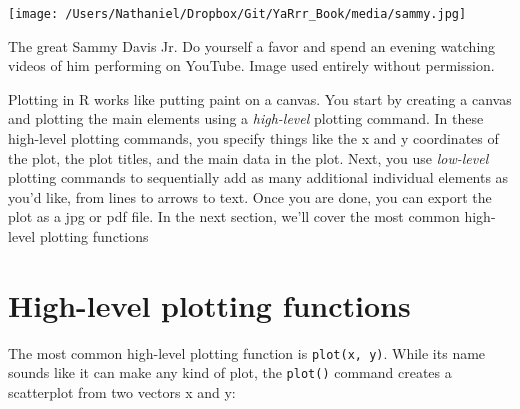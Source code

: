 \documentclass{tufte-book}\usepackage[]{graphicx}\usepackage[]{color}
\newcommand{\newfun}[1]{\begin{LARGE} \begin{center} \texttt{#1} \end{center} \end{LARGE}}
\begin{document}
\begin{footnotesize}
\begin{marginfigure}
\texttt{[image: /Users/Nathaniel/Dropbox/Git/YaRrr\_Book/media/sammy.jpg]}
\caption{The great Sammy Davis Jr. Do yourself a favor and spend an evening watching videos of him performing on YouTube. Image used entirely without permission.}
\label{fig:sammy}
\end{marginfigure}

Plotting in R works like putting paint on a canvas. You start by creating a canvas and plotting the main elements using a \textit{high-level} plotting command. In these high-level plotting commands, you specify things like the x and y coordinates of the plot, the plot titles, and the main data in the plot. Next, you use \textit{low-level} plotting commands to sequentially add as many additional individual elements as you'd like, from lines to arrows to text. Once you are done, you can export the plot as a jpg or pdf file. In the next section, we'll cover the most common high-level plotting functions


\section{High-level plotting functions}

The most common high-level plotting function is \texttt{plot(x, y)}. While its name sounds like it can make any kind of plot, the \texttt{plot()} command creates a scatterplot from two vectors x and y:




\vspace{5mm} %
\noindent
\setlength{\fboxrule}{1.5pt}
\fbox{
\parbox{\textwidth}{

\newfun{plot()}\index{plot()}

\hline

\begin{description}


\end{description}}}
\end{footnotesize}
\end{document}
